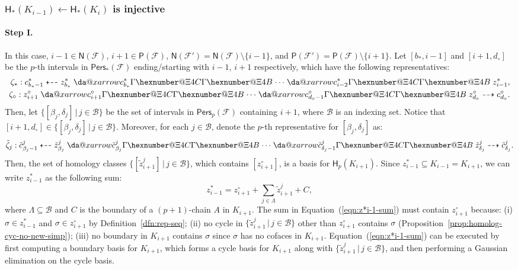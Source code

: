 \documentclass[letterpaper,11pt]{article}
\makeatletter
\theoremstyle{mythmstyle}
\theoremstyle{mydefstyle}
\theoremstyle{plain}
\theoremstyle{definition}
\newcommand{\Hm}{\mathsf{H}}
\newcommand{\Pers}{\mathsf{Pers}}
\newcommand{\pinds}{\mathsf{P}}
\newcommand{\ninds}{\mathsf{N}}
\newcommand{\<}[1]{\langle #1\rangle}
\newcommand{\given}{\,|\,}
\newcommand{\Set}[1]{\{#1\}}
\newcommand{\Bcal}{\mathcal{B}}
\newcommand{\Fcal}{\mathcal{F}}
\newcommand{\bG}{\beta}
\newcommand{\dG}{\delta}
\newcommand{\LG}{\Lambda}
\newcommand{\sG}{\sigma}
\newcommand{\Dim}{p}
\newcommand{\cyc}{z}
\newcommand{\chn}{c}
\newcommand{\rseq}{\zeta}
\newcommand*{\da@rightarrow}{\mathchar"0\hexnumber@\symAMSa 4B }
\newcommand*{\da@leftarrow}{\mathchar"0\hexnumber@\symAMSa 4C }
\newcommand{\xdashleftrightarrow}[2][]{%
  \mathrel{%
    \mathpalette{\da@xarrow{#1}{#2}\da@leftarrow\da@rightarrow{}{}}{}%
  }%
}
\newcommand*{\da@xarrow}[7]{%
  \sbox0{$\ifx#7\scriptstyle\scriptscriptstyle\else\scriptstyle\fi#5#1#6\m@th$}%
  \sbox2{$\ifx#7\scriptstyle\scriptscriptstyle\else\scriptstyle\fi#5#2#6\m@th$}%
  \sbox4{$#7\dabar@\m@th$}%
  \dimen@=\wd0 %
  \ifdim\wd2 >\dimen@
    \dimen@=\wd2 %
  \fi
  \count@=2 %
  \def\da@bars{\dabar@\dabar@}%
  \@whiledim\count@\wd4<\dimen@\do{%
    \advance\count@\@ne
    \expandafter\def\expandafter\da@bars\expandafter{%
      \da@bars
      \dabar@ 
    }%
  }%
  \mathrel{#3}%
  \mathrel{%
    \mathop{\da@bars}\limits
    \ifx\\#1\\%
    \else
      _{\copy0}%
    \fi
    \ifx\\#2\\%
    \else
      ^{\copy2}%
    \fi
  }%
  \mathrel{#4}%
  \!\!
}
\let\rseqlrarr\xdashleftrightarrow
\makeatother
\begin{document}
\subsubsection{$\Hm_*(K_{i-1})\leftarrow \Hm_*(K_i)$ is injective}

\paragraph{Step I.}
In this case, $i-1\in\ninds(\Fcal)$, $i+1\in\pinds(\Fcal)$,
$\ninds(\Fcal')=\ninds(\Fcal)\setminus\Set{i-1}$,
and $\pinds(\Fcal')=\pinds(\Fcal)\setminus\Set{i+1}$.
Let $[b_*,i-1]$ and $[i+1,d_\circ]$ be the $\Dim$-th intervals in $\Pers_*(\Fcal)$
ending/starting with $i-1$, $i+1$ respectively,
which have the following representatives:
\begin{align*}
\begin{split}
\rseq_*:\chn^*_{b_*-1}\dashleftarrow\cyc^*_{b_*}\rseqlrarr{\chn^*_{b_*}}\cdots
\rseqlrarr{\chn^*_{i-2}}\cyc^*_{i-1},
\\
\rseq_\circ:
\cyc^\circ_{i+1}\rseqlrarr{\chn^\circ_{i+1}}\cdots
\rseqlrarr{\chn^\circ_{d_\circ-1}}\cyc^\circ_{d_\circ}\dashrightarrow\chn^\circ_{d_\circ}.
\end{split}
\end{align*}
Then, let $\Set{[\bG_j,\dG_j]\given j\in\Bcal}$ be the set of intervals in $\Pers_\Dim(\Fcal)$
containing $i+1$, where $\Bcal$ is an indexing set.
Notice that $[i+1,d_\circ]\in\Set{[\bG_j,\dG_j]\given j\in\Bcal}$.
Moreover, for each $j\in\Bcal$, 
denote the $\Dim$-th representative for $[\bG_j,\dG_j]$ as:
\[\tilde{\rseq}_j:\tilde{\chn}^j_{\bG_j-1}\dashleftarrow\tilde{\cyc}^j_{\bG_j}
\rseqlrarr{\tilde{\chn}^j_{\bG_j}}\cdots
\rseqlrarr{\tilde{\chn}^j_{\dG_j-1}}\tilde{\cyc}^j_{\dG_j}\dashrightarrow\tilde{\chn}^j_{\dG_j}.\]
Then, the set of homology classes 
$\Set{[\tilde{\cyc}^j_{i+1}]\given {j\in\Bcal}}$,
which contains $[\cyc^\circ_{i+1}]$,
is a basis for $\Hm_\Dim(K_{i+1})$.
Since $\cyc^*_{i-1}\subseteq K_{i-1}=K_{i+1}$,
we can write $\cyc^*_{i-1}$ as the following sum:
\begin{equation}\label{eqn:z*i-1-sum}
\cyc^*_{i-1}=\cyc^\circ_{i+1}+\sum_{j\in\LG}\tilde{\cyc}^j_{i+1}+C,
\end{equation}
where $\LG\subseteq\Bcal$ and $C$ is the boundary
of a $(p+1)$-chain $A$ in $K_{i+1}$.
The sum in Equation~(\ref{eqn:z*i-1-sum}) must contain
$\cyc^\circ_{i+1}$ because: (i) $\sG\in\cyc^*_{i-1}$ and $\sG\in\cyc^\circ_{i+1}$
by Definition~\ref{dfn:rep-seq};
(ii) no cycle in $\Set{\tilde{\cyc}^j_{i+1}\given j\in\Bcal}$ other than $\cyc^\circ_{i+1}$ contains $\sG$
(Proposition~\ref{prop:homolog-cyc-no-new-simp});
(iii) no boundary in $K_{i+1}$ contains $\sG$ since $\sG$ has no cofaces in $K_{i+1}$.
Equation~(\ref{eqn:z*i-1-sum}) can be executed by first 
computing a boundary basis for $K_{i+1}$, 
which forms a cycle basis for $K_{i+1}$ along with $\Set{\tilde{\cyc}^j_{i+1}\given j\in\Bcal}$, and then performing a Gaussian elimination on the cycle basis.
\end{document}
